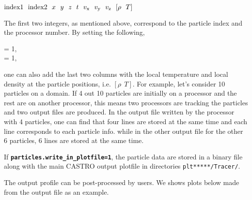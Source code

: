 \vspace{0.1in}
${\rm index1}~~{\rm index2}~~x~~ y~~ z~~ t~~ v_{\rm x} ~~v_{\rm y}~~ v_{\rm z}~~ [\rho ~~ T]$
\vspace{0.1in}

\noindent The first two integers, as mentioned above, correspond to the particle index and the processor number. By setting the following,

\vspace{0.1in}
= 1,\\
     = 1,
\vspace{0.1in}

\noindent one can also add the last two columns with the local temperature and local density at the particle positions, i.e. $[\rho ~~ T]$. For example, let's consider 10 particles on a domain.  If 4 out 10 particles are initially on a processor and the rest are on another processor, this means two processors are tracking the particles and two output files are produced. In the output file written by the processor with 4 particles, one can find that four lines are stored at the same time and each line corresponds to each particle info. while in the other output file for the other 6 particles, 6 lines are stored at the same time. 



\vspace{0.05in}

\noindent If {\tt {\bf particles.write\_in\_plotfile=1}}, the particle data are stored in a binary file along with the main CASTRO output plotfile in directories {\tt plt*****/Tracer/}. 
\vspace{0.05in}


\noindent The output profile can be post-processed by users. We shows plots below made from the output file as an example.

